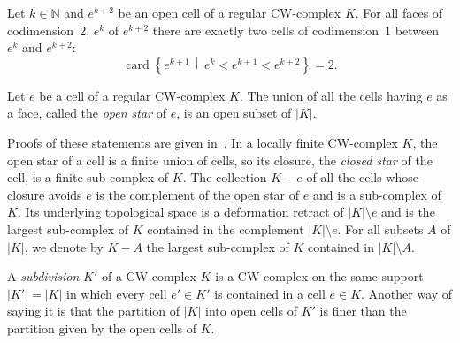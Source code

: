 \documentclass[AHL,Unicode,longabstracts,published]{cedram}
\newcommand{\N}{\mathbb{N}}
\DeclareMathOperator{\card}{card}
\begin{document}
\begin{lemm}\label{lemm:2_faces}
Let $k\in\N$ and $e^{k+2}$ be an open cell of a regular CW-complex $K$. For all faces of codimension~2, $e^k$ of $e^{k+2}$ there are exactly two cells of codimension~1 between $e^k$ and $e^{k+2}$:
\begin{equation*}
\card \left\{e^{k+1}\,\middle|\,e^k<e^{k+1}<e^{k+2}\right\}=2.
\end{equation*}
\end{lemm}

\begin{lemm}
Let $e$ be a cell of a regular CW-complex $K$. The union of all the cells having $e$ as a face, called the \emph{open star} of $e$, is an open subset of $|K|$.
\end{lemm}

Proofs of these statements are given in~\cite[Proposition~1.6, p.~30, Theorem~4.2, pp.~231-232, Lemma~4.1, p.~230]{Coo-Fin_hom_cel}.
In a locally finite CW-complex $K$, the open star of a cell is a finite union of cells, so its closure, the \emph{closed star} of the cell, is a finite sub-complex of $K$. The collection $K-e$ of all the cells whose closure avoids $e$ is the complement of the open star of $e$ and is a sub-complex of $K$. Its underlying topological space is a deformation retract of $|K|\setminus e$ and is the largest sub-complex of $K$ contained in the complement $|K|\setminus e$. For all subsets $A$ of $|K|$, we denote by $K-A$ the largest sub-complex of $K$ contained in $|K|\setminus A$.

\begin{defi}[Subdivisions]
A \emph{subdivision} $K'$ of a CW-complex $K$ is a CW-complex on the same support $|K'|=|K|$ in which every cell $e'\in K'$ is contained in a cell $e\in K$. Another way of saying it is that the partition of $|K|$ into open cells of $K'$ is finer than the partition given by the open cells of $K$.
\end{defi}
\end{document}
